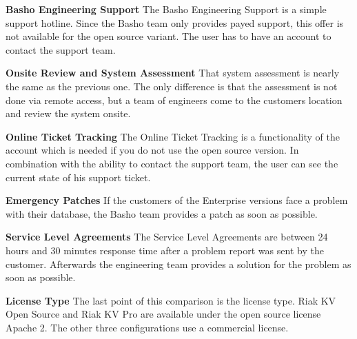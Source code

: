 \textbf{Basho Engineering Support}\newline
The Basho Engineering Support is a simple support hotline. Since the Basho team only provides payed support, this offer is not available for the open source variant. The user has to have an account to contact the support team. \cite{Basho.01.04.2017}


\textbf{Onsite Review and System Assessment}\newline
That system assessment is nearly the same as the previous one. The only difference is that the assessment is not done via remote access, but a team of engineers come to the customers location and review the system onsite. \cite{Basho.01.04.2017}

\textbf{Online Ticket Tracking}\newline
The Online Ticket Tracking is a functionality of the account which is needed if you do not use the open source version. In combination with the ability to contact the support team, the user can see the current state of his support ticket. \cite{Basho.01.04.2017}

\textbf{Emergency Patches}\newline
If the customers of the Enterprise versions face a problem with their database, the Basho team provides a patch as soon as possible. \cite{Basho.01.04.2017}

\textbf{Service Level Agreements}\newline
The Service Level Agreements are between 24 hours and 30 minutes response time after a problem report was sent by the customer. Afterwards the engineering team provides a solution for the problem as soon as possible. \cite{Basho.01.04.2017} 

\textbf{License Type}\newline
The last point of this comparison is the license type. Riak KV Open Source and Riak KV Pro are available under the open source license Apache 2. The other three configurations use a commercial license. \cite{Basho.01.04.2017}

\newpage